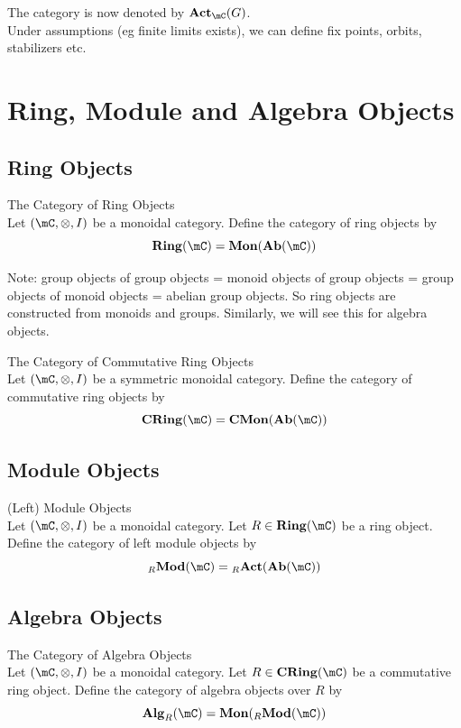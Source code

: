 \documentclass[a4paper]{article}
\begin{document}
The category is now denoted by $\bold{Act}_\mC(G)$. \\

Under assumptions (eg finite limits exists), we can define fix points, orbits, stabilizers etc. 

\pagebreak
\section{Ring, Module and Algebra Objects}
\subsection{Ring Objects}
\begin{defn}{The Category of Ring Objects}{}\\
Let $(\mC,\otimes,I)$ be a monoidal category. Define the category of ring objects by $$\bold{Ring}(\mC)=\bold{Mon}(\bold{Ab}(\mC))$$
\end{defn}

Note: group objects of group objects = monoid objects of group objects = group objects of monoid objects = abelian group objects. So ring objects are constructed from monoids and groups. Similarly, we will see this for algebra objects. 

\begin{defn}{The Category of Commutative Ring Objects}{}\\
Let $(\mC,\otimes,I)$ be a symmetric monoidal category. Define the category of commutative ring objects by $$\bold{CRing}(\mC)=\bold{CMon}(\bold{Ab}(\mC))$$
\end{defn}

\subsection{Module Objects}
\begin{defn}{(Left) Module Objects}{}\\
Let $(\mC,\otimes,I)$ be a monoidal category. Let $R\in\bold{Ring}(\mC)$ be a ring object. Define the category of left module objects by $${_R}\bold{Mod}(\mC)={_R}\bold{Act}(\bold{Ab}(\mC))$$
\end{defn}

\subsection{Algebra Objects}
\begin{defn}{The Category of Algebra Objects}{}\\
Let $(\mC,\otimes,I)$ be a monoidal category. Let $R\in\bold{CRing}(\mC)$ be a commutative ring object. Define the category of algebra objects over $R$ by $$\bold{Alg}_R(\mC)=\bold{Mon}({_R}\bold{Mod}(\mC))$$
\end{defn}
\end{document}
